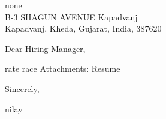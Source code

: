\documentclass[11pt,a4paper]{letter}
\begin{document}
\begin{letter}{
none\\
B-3 SHAGUN AVENUE Kapadvanj\\
Kapadvanj, Kheda, Gujarat, India, 387620
}
\address{
nilay\\
B-3 SHAGUN AVENUE Kapadvanj\\
Kapadvanj, Kheda, Gujarat, India, 387620\\
9016989674\\
\href{mailto:nilaypatel@gmail.com}{nilaypatel@gmail.com}
}
\date{12/11/2024}
\opening{Dear Hiring Manager,}
rate race
\vspace{\baselineskip}\noindent Attachments: Resume
\closing{Sincerely,}
\vspace{0.5in}
nilay
\end{letter}
\end{document}
